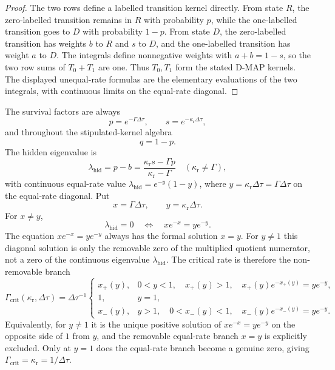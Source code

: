 \begin{proof}
The two rows define a labelled transition kernel directly.  From state \(R\),
the zero-labelled transition remains in \(R\) with probability \(p\), while the
one-labelled transition goes to \(D\) with probability \(1-p\).  From state
\(D\), the zero-labelled transition has weights \(b\) to \(R\) and \(s\) to
\(D\), and the one-labelled transition has weight \(a\) to \(D\).  The
integrals define nonnegative weights with \(a+b=1-s\), so the two row sums of
\(T_0+T_1\) are one.  Thus \(T_0,T_1\) form the stated D-MAP kernels.  The
displayed unequal-rate formulas are the elementary evaluations of the two
integrals, with continuous limits on the equal-rate diagonal.
\end{proof}

\begin{lemma}\label{lem:equal-rate-critical-convention-main}
The survival factors are always
\[
p=e^{-\Gamma\Delta\tau},\qquad
s=e^{-\kappa_{\mathrm r}\Delta\tau},
\]
and throughout the stipulated-kernel algebra
\[
q=1-p .
\]
The hidden eigenvalue is
\begin{equation}\label{eq:lambda-hid-main}
\lambda_{\mathrm{hid}}
=p-b
=\frac{\kappa_{\mathrm r}s-\Gamma p}{\kappa_{\mathrm r}-\Gamma}
\quad(\kappa_{\mathrm r}\ne\Gamma),
\end{equation}
with continuous equal-rate value
\(\lambda_{\mathrm{hid}}=e^{-y}(1-y)\), where
\(y=\kappa_{\mathrm r}\Delta\tau=\Gamma\Delta\tau\) on the equal-rate
diagonal.  Put
\[
x=\Gamma\Delta\tau,\qquad y=\kappa_{\mathrm r}\Delta\tau .
\]
For \(x\ne y\),
\[
\lambda_{\mathrm{hid}}=0
\quad\Longleftrightarrow\quad
x e^{-x}=y e^{-y}.
\]
The equation \(x e^{-x}=y e^{-y}\) always has the formal solution \(x=y\).
For \(y\ne1\) this diagonal solution is only the removable zero of the
multiplied quotient numerator, not a zero of the continuous eigenvalue
\(\lambda_{\mathrm{hid}}\).  The critical rate is therefore the non-removable
branch
\begin{equation}\label{eq:gamma-crit-piecewise-main}
\Gamma_{\mathrm{crit}}(\kappa_{\mathrm r},\Delta\tau)
=\Delta\tau^{-1}
\begin{cases}
x_+(y),&0<y<1,\quad x_+(y)>1,\quad x_+(y)e^{-x_+(y)}=y e^{-y},\\
1,&y=1,\\
x_-(y),&y>1,\quad 0<x_-(y)<1,\quad x_-(y)e^{-x_-(y)}=y e^{-y}.
\end{cases}
\end{equation}
Equivalently, for \(y\ne1\) it is the unique positive solution of
\(x e^{-x}=y e^{-y}\) on the opposite side of \(1\) from \(y\), and the
removable equal-rate branch \(x=y\) is explicitly excluded.  Only at \(y=1\)
does the equal-rate branch become a genuine zero, giving
\(\Gamma_{\mathrm{crit}}=\kappa_{\mathrm r}=1/\Delta\tau\).
\end{lemma}

